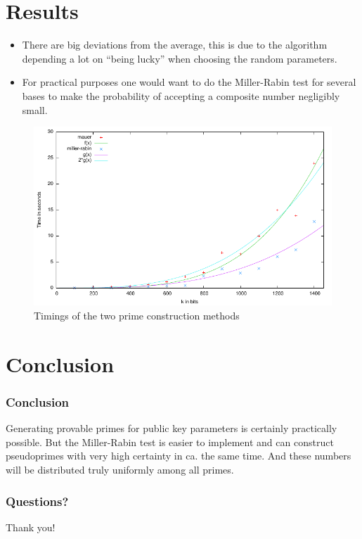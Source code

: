 \documentclass{beamer}
\begin{document}
\section{Results}
\begin{frame}
  \begin{itemize}
  \item There are big deviations from the average, this is due to the
    algorithm depending a lot on ``being lucky'' when choosing the
    random parameters.

  \item For practical purposes one would want to do the Miller-Rabin
    test for several bases to make the probability of accepting a
    composite number negligibly small.
  \end{itemize}
\end{frame}

\begin{frame}
\begin{figure}[h]
  \centering
  \includegraphics[scale=0.8]{plot.pdf}
  \caption{Timings of the two prime construction methods}
  \label{fig:timings}
\end{figure}
\end{frame}

\section{Conclusion}
\begin{frame}
  \frametitle{Conclusion} Generating provable primes for public key
  parameters is certainly practically possible. But the Miller-Rabin
  test is easier to implement and can construct pseudoprimes with very
  high certainty in ca. the same time. And these numbers will be
  distributed truly uniformly among all primes.
\end{frame}
\begin{frame}
  \frametitle{Questions?}
\pause
Thank you!
\end{frame}
\end{document}
